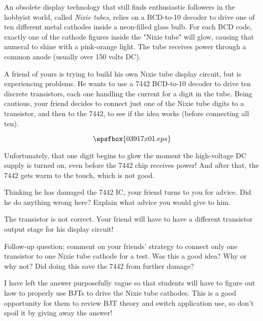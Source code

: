 

An obsolete display technology that still finds enthusiastic followers in the hobbyist world, called {\it Nixie tubes}, relies on a BCD-to-10 decoder to drive one of ten different metal cathodes inside a neon-filled glass bulb.  For each BCD code, exactly one of the cathode figures inside the "Nixie tube" will glow, causing that numeral to shine with a pink-orange light.  The tube receives power through a common anode (usually over 150 volts DC).

A friend of yours is trying to build his own Nixie tube display circuit, but is experiencing problems.  He wants to use a 7442 BCD-to-10 decoder to drive ten discrete transistors, each one handling the current for a digit in the tube.  Being cautious, your friend decides to connect just one of the Nixie tube digits to a transistor, and then to the 7442, to see if the idea works (before connecting all ten).

$$\epsfbox{03917x01.eps}$$

Unfortunately, that one digit begins to glow the moment the high-voltage DC supply is turned on, even before the 7442 chip receives power!  And after that, the 7442 gets warm to the touch, which is not good.

Thinking he has damaged the 7442 IC, your friend turns to you for advice.  Did he do anything wrong here?  Explain what advice you would give to him.







The transistor is not correct.  Your friend will have to have a different transistor output stage for his display circuit!

\vskip 10pt

Follow-up question: comment on your friends' strategy to connect only one transistor to one Nixie tube cathode for a test.  Was this a good idea?  Why or why not?  Did doing this save the 7442 from further damage?







I have left the answer purposefully vague so that students will have to figure out how to properly use BJTs to drive the Nixie tube cathodes.  This is a good opportunity for them to review BJT theory and switch application use, so don't spoil it by giving away the answer!




